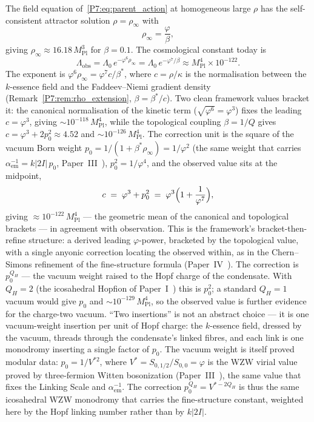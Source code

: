\documentclass[11pt,a4paper]{article}
\theoremstyle{definition}
\theoremstyle{remark}
\newcommand{\vp}{\varphi}
\newcommand{\bst}{\beta^{*}}
\newcommand{\MPl}{M_{\mathrm{Pl}}}
\newcommand{\Lobs}{\Lambda_{\mathrm{obs}}}
\newcommand{\rinfty}{\rho_{\infty}}
\newcommand{\aem}{\alpha_{\mathrm{em}}}
\begin{document}
The field equation of~\eqref{P7:eq:parent_action} at homogeneous large
$\rho$ has the self-consistent attractor solution $\rho=\rinfty$ with
\begin{equation}
  \rinfty = \frac{\vp}{\beta},
  \label{P7:eq:rho_inf}
\end{equation}
giving $\rinfty\approx16.18\,\MPl^3$ for $\beta=0.1$.
The cosmological constant today is
\begin{equation}
  \boxed{\Lobs = \Lambda_0\,e^{-\vp^6\rinfty}
               = \Lambda_0\,e^{-\vp^7/\beta}
               \approx \MPl^4\times10^{-122}.}
  \label{P7:eq:Lambda_obs}
\end{equation}
The exponent is $\vp^6\rinfty = \vp^7 c/\bst$, where $c=\rho/\kappa$ is
the normalisation between the $k$-essence field and the Faddeev--Niemi
gradient density (Remark~\ref{P7:rem:rho_extension}, $\beta=\bst/c$).  Two
clean framework values bracket it: the canonical normalisation of the
kinetic term ($\sqrt{\vp^6}=\vp^3$) fixes the leading $c=\vp^3$, giving
$\sim10^{-118}\,\MPl^4$, while the topological coupling $\beta=1/Q$ gives
$c=\vp^3+2p_0^2\approx4.52$ and $\sim10^{-126}\,\MPl^4$.  The correction
unit is the square of the vacuum Born weight
$p_0 = 1/(1+\bst\rinfty) = 1/\vp^2$ (the same weight that carries
$\aem^{-1}=k|2I|\,p_0$, Paper~III~\cite{Paper3}), $p_0^2=1/\vp^4$, and the
observed value sits at the midpoint,
\begin{equation}
  c \;=\; \vp^3 + p_0^2 \;=\; \vp^3\Bigl(1+\frac{1}{\vp^7}\Bigr),
  \label{P7:eq:cc_c}
\end{equation}
giving $\approx10^{-122}\,\MPl^4$ --- the geometric mean of the canonical
and topological brackets --- in agreement with observation.  This is the
framework's bracket-then-refine structure: a derived leading $\vp$-power,
bracketed by the topological value, with a single anyonic correction
locating the observed within, as in the Chern--Simons refinement of the
fine-structure formula (Paper~IV~\cite{Paper4}).  The correction is
$p_0^{Q_H}$ --- the vacuum weight raised to the Hopf charge of the
condensate.  With $Q_H=2$ (the icosahedral Hopfion of Paper~I~\cite{Paper1}) this is
$p_0^2$; a standard $Q_H=1$ vacuum would give $p_0$ and
$\sim10^{-129}\,\MPl^4$, so the observed value is further evidence for the
charge-two vacuum.  ``Two insertions'' is not an abstract choice --- it is
one vacuum-weight insertion per unit of Hopf charge: the $k$-essence
field, dressed by the vacuum, threads through the condensate's linked
fibres, and each link is one monodromy inserting a single factor of
$p_0$.  The vacuum weight is itself proved modular data:
$p_0 = 1/V^{*2}$, where $V^* = S_{0,1/2}/S_{0,0} = \vp$ is the WZW virial
value proved by three-fermion Witten bosonization
(Paper~III~\cite{Paper3}), the same value that fixes the Linking Scale and
$\aem^{-1}$.  The correction $p_0^{Q_H}=V^{*-2Q_H}$ is thus the same
icosahedral WZW monodromy that carries the fine-structure constant,
weighted here by the Hopf linking number rather than by $k|2I|$.
\end{document}
